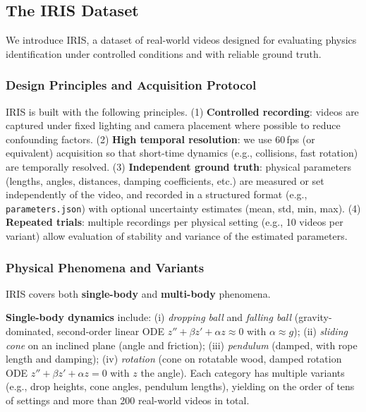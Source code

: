 \subsection{The IRIS Dataset}
\label{sec:dataset}

We introduce IRIS, a dataset of real-world videos designed for evaluating physics identification under controlled conditions and with reliable ground truth.

\subsubsection{Design Principles and Acquisition Protocol}
\label{sec:dataset_design}

IRIS is built with the following principles. (1) \textbf{Controlled recording}: videos are captured under fixed lighting and camera placement where possible to reduce confounding factors. (2) \textbf{High temporal resolution}: we use 60\,fps (or equivalent) acquisition so that short-time dynamics (e.g., collisions, fast rotation) are temporally resolved. (3) \textbf{Independent ground truth}: physical parameters (lengths, angles, distances, damping coefficients, etc.) are measured or set independently of the video, and recorded in a structured format (e.g., \texttt{parameters.json}) with optional uncertainty estimates (mean, std, min, max). (4) \textbf{Repeated trials}: multiple recordings per physical setting (e.g., 10 videos per variant) allow evaluation of stability and variance of the estimated parameters.

\subsubsection{Physical Phenomena and Variants}
\label{sec:dataset_phenomena}

IRIS covers both \textbf{single-body} and \textbf{multi-body} phenomena.

\textbf{Single-body dynamics} include: (i) \emph{dropping ball} and \emph{falling ball} (gravity-dominated, second-order linear ODE $z'' + \beta z' + \alpha z \approx 0$ with $\alpha \approx g$); (ii) \emph{sliding cone} on an inclined plane (angle and friction); (iii) \emph{pendulum} (damped, with rope length and damping); (iv) \emph{rotation} (cone on rotatable wood, damped rotation ODE $z'' + \beta z' + \alpha z = 0$ with $z$ the angle). Each category has multiple variants (e.g., drop heights, cone angles, pendulum lengths), yielding on the order of tens of settings and more than 200 real-world videos in total.

